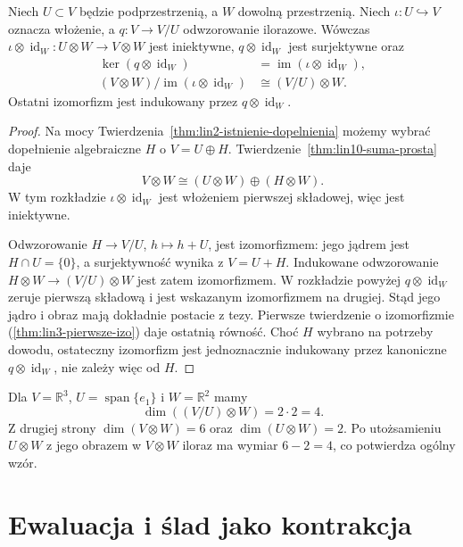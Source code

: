 \begin{twierdzenie}
\label{thm:lin10-iloraz}
Niech \(U\subset V\) będzie
podprzestrzenią, a \(W\)
dowolną przestrzenią.
Niech \(\iota\colon U\hookrightarrow V\)
oznacza włożenie,
a \(q\colon V\to V/U\)
odwzorowanie ilorazowe.
Wówczas
\(\iota\otimes\operatorname{id}_W
\colon U\otimes W\to V\otimes W\)
jest iniektywne,
\(q\otimes\operatorname{id}_W\)
jest surjektywne oraz
\[
 \begin{aligned}
 \ker(q\otimes\operatorname{id}_W)
 &=\operatorname{im}
      (\iota\otimes\operatorname{id}_W),\\
 (V\otimes W)/
 \operatorname{im}(\iota\otimes\operatorname{id}_W)
 &\cong(V/U)\otimes W.
 \end{aligned}
\]
Ostatni izomorfizm jest
indukowany przez
\(q\otimes\operatorname{id}_W\).
\end{twierdzenie}
\begin{proof}
Na mocy
Twierdzenia~\ref{thm:lin2-istnienie-dopelnienia}
możemy wybrać
dopełnienie algebraiczne \(H\)
o \(V=U\oplus H\).
Twierdzenie~\ref{thm:lin10-suma-prosta}
daje
\[
 V\otimes W\cong
 (U\otimes W)\oplus(H\otimes W).
\]
W tym rozkładzie
\(\iota\otimes\operatorname{id}_W\)
jest włożeniem pierwszej
składowej, więc jest iniektywne.

Odwzorowanie
\(H\to V/U\), \(h\mapsto h+U\),
jest izomorfizmem:
jego jądrem jest \(H\cap U=\{0\}\),
a surjektywność wynika
z \(V=U+H\).
Indukowane odwzorowanie
\(H\otimes W\to(V/U)\otimes W\)
jest zatem izomorfizmem.
W rozkładzie powyżej
\(q\otimes\operatorname{id}_W\)
zeruje pierwszą składową
i jest wskazanym izomorfizmem
na drugiej. Stąd jego
jądro i obraz mają dokładnie
postacie z tezy.
Pierwsze twierdzenie o izomorfizmie
(\ref{thm:lin3-pierwsze-izo})
daje ostatnią równość.
Choć \(H\) wybrano na potrzeby
dowodu, ostateczny izomorfizm
jest jednoznacznie indukowany
przez kanoniczne
\(q\otimes\operatorname{id}_W\),
nie zależy więc od \(H\).
\end{proof}

\begin{przyklad}
\label{prz:lin10-iloraz}
Dla \(V=\mathbb R^3\),
\(U=\operatorname{span}\{e_1\}\)
i \(W=\mathbb R^2\) mamy
\[
 \dim((V/U)\otimes W)=2\cdot2=4.
\]
Z drugiej strony
\(\dim(V\otimes W)=6\)
oraz \(\dim(U\otimes W)=2\).
Po utożsamieniu \(U\otimes W\)
z jego obrazem w \(V\otimes W\)
iloraz ma wymiar \(6-2=4\),
co potwierdza ogólny wzór.
\end{przyklad}

\section{Ewaluacja i ślad jako kontrakcja}
\label{sec:lin10-kontrakcja}

